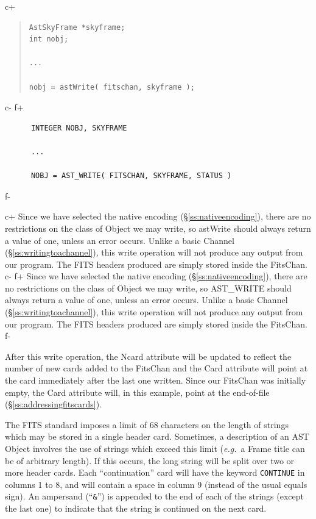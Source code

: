 \documentclass[twoside,11pt]{article}
\newcommand{\secref}[1]{\S\ref{#1}}
\newcommand{\secref}[1]{\ref{#1}}
\begin{document}
c+
\begin{quote}
\small
\begin{verbatim}
AstSkyFrame *skyframe;
int nobj;

...

nobj = astWrite( fitschan, skyframe );
\end{verbatim}
\normalsize
\end{quote}
c-
f+
\small
\begin{verbatim}
      INTEGER NOBJ, SKYFRAME

      ...

      NOBJ = AST_WRITE( FITSCHAN, SKYFRAME, STATUS )
\end{verbatim}
\normalsize
f-

c+
Since we have selected the native encoding
(\secref{ss:nativeencoding}), there are no restrictions on the class
of Object we may write, so astWrite should always return a value of
one, unless an error occurs. Unlike a basic Channel
(\secref{ss:writingtoachannel}), this write operation will not produce
any output from our program. The FITS headers produced are simply
stored inside the FitsChan.
c-
f+
Since we have selected the native encoding
(\secref{ss:nativeencoding}), there are no restrictions on the class
of Object we may write, so AST\_WRITE should always return a value of
one, unless an error occurs. Unlike a basic Channel
(\secref{ss:writingtoachannel}), this write operation will not produce
any output from our program. The FITS headers produced are simply
stored inside the FitsChan.
f-

After this write operation, the Ncard attribute will be updated to
reflect the number of new cards added to the FitsChan and the Card
attribute will point at the card immediately after the last one
written. Since our FitsChan was initially empty, the Card attribute
will, in this example, point at the end-of-file
(\secref{ss:addressingfitscards}).

The FITS standard imposes a limit of 68 characters on the length of
strings which may be stored in a single header card. Sometimes, a
description of an AST Object involves the use of strings which exceed
this limit ({\em{e.g.}}\ a Frame title can be of arbitrary length). If
this occurs, the long string will be split over two or more header cards.
Each ``continuation'' card will have the keyword {\tt CONTINUE} in
columns 1 to 8, and will contain a space in column 9 (instead of the
usual equals sign). An ampersand (``{\tt \&}'') is appended to the end of
each of the strings (except the last one) to indicate that the string is
continued on the next card.
\end{document}

